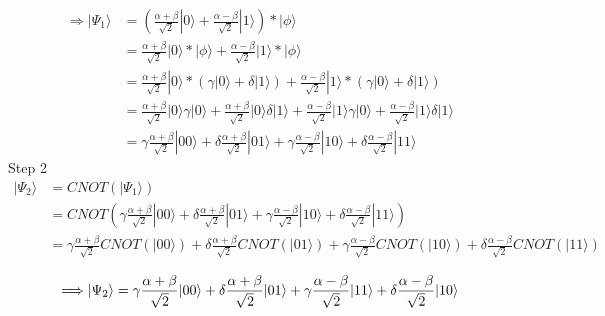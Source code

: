 \documentclass{article}
\begin{document}
\begin{equation}
\begin{split}
    \Longrightarrow |\Psi_1\rangle & = (\frac{\alpha + \beta}{\sqrt{2}}|0\rangle
        + \frac{\alpha - \beta}{\sqrt{2}}|1\rangle) * |\phi\rangle \\
    & = \frac{\alpha + \beta}{\sqrt{2}}|0\rangle * |\phi\rangle
        + \frac{\alpha - \beta}{\sqrt{2}}|1\rangle * |\phi\rangle \\
    & = \frac{\alpha + \beta}{\sqrt{2}}|0\rangle * (\gamma|0\rangle + \delta|1\rangle)
        + \frac{\alpha - \beta}{\sqrt{2}}|1\rangle * (\gamma|0\rangle + \delta|1\rangle) \\
    & = \frac{\alpha + \beta}{\sqrt{2}}|0\rangle\gamma|0\rangle
        + \frac{\alpha + \beta}{\sqrt{2}}|0\rangle\delta|1\rangle
        + \frac{\alpha - \beta}{\sqrt{2}}|1\rangle\gamma|0\rangle
        + \frac{\alpha - \beta}{\sqrt{2}}|1\rangle\delta|1\rangle \\
    & = \gamma\frac{\alpha + \beta}{\sqrt{2}}|00\rangle
        + \delta\frac{\alpha + \beta}{\sqrt{2}}|01\rangle
        + \gamma\frac{\alpha - \beta}{\sqrt{2}}|10\rangle
        + \delta\frac{\alpha - \beta}{\sqrt{2}}|11\rangle
\end{split}
\end{equation}
Step 2
\begin{equation}
\begin{split}
    |\Psi_2\rangle & = CNOT(|\Psi_1\rangle) \\
    & = CNOT(\gamma\frac{\alpha + \beta}{\sqrt{2}}|00\rangle
        + \delta\frac{\alpha + \beta}{\sqrt{2}}|01\rangle
        + \gamma\frac{\alpha - \beta}{\sqrt{2}}|10\rangle
        + \delta\frac{\alpha - \beta}{\sqrt{2}}|11\rangle) \\
    & = \gamma\frac{\alpha + \beta}{\sqrt{2}}CNOT(|00\rangle)
        + \delta\frac{\alpha + \beta}{\sqrt{2}}CNOT(|01\rangle)
        + \gamma\frac{\alpha - \beta}{\sqrt{2}}CNOT(|10\rangle)
        + \delta\frac{\alpha - \beta}{\sqrt{2}}CNOT(|11\rangle) \\
\end{split}
\end{equation}
\begin{equation}
    \Longrightarrow |\Psi_2\rangle = \gamma\frac{\alpha + \beta}{\sqrt{2}}|00\rangle
        + \delta\frac{\alpha + \beta}{\sqrt{2}}|01\rangle
        + \gamma\frac{\alpha - \beta}{\sqrt{2}}|11\rangle
        + \delta\frac{\alpha - \beta}{\sqrt{2}}|10\rangle \\
\end{equation}
\end{document}

